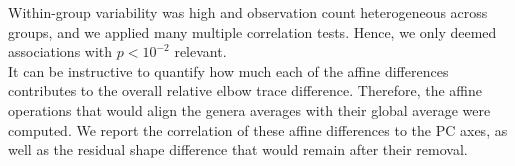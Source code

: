\documentclass[10pt, a4paper]{article}
\begin{document}
\begin{linenumbers}[1]
Within-group variability was high and observation count heterogeneous across groups, and we applied many multiple correlation tests. 
Hence, we only deemed associations with $p<10^{-2}$ relevant. 
\\It can be instructive to quantify how much each of the affine differences contributes to the overall relative elbow trace difference. 
Therefore, the affine operations that would align the genera averages with their global average were computed. 
We report the correlation of these affine differences to the PC axes, as well as the residual shape difference that would remain after their removal. 
\end{linenumbers}



\FloatBarrier\pagebreak
\end{document}
